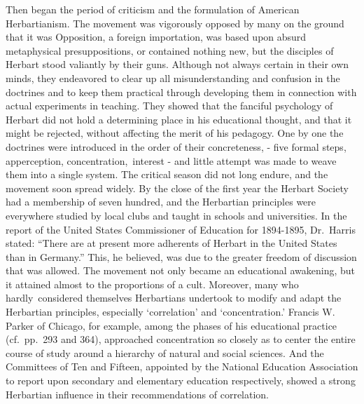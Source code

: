 \documentclass[]{book}
\begin{document}
Then began the period of criticism and the formulation of American Herbartianism. The movement was vigorously opposed by many on the ground that it was Opposition, a foreign importation, was based upon absurd metaphysical presuppositions, or contained nothing new, but the disciples of Herbart stood valiantly by their guns. Although not always certain in their own minds, they endeavored to clear up all misunderstanding and confusion in the doctrines and to keep them practical through developing them in connection with actual experiments in teaching. They showed that the fanciful psychology of Herbart did not hold a determining place in his educational thought, and that it might be rejected, without affecting the merit of his pedagogy. One by one the doctrines were introduced in the order of their concreteness, - five formal steps, apperception, concentration,~interest - and little attempt was made to weave them into a single system. The critical season did not long endure, and the movement soon spread widely. By the close of the first year the Herbart Society had a membership of seven hundred, and the Herbartian principles were everywhere studied by local clubs and taught in schools and universities. In the report of the United States Commissioner of Education for 1894-1895, Dr.~Harris stated: ``There are at present more adherents of Herbart in the United States than in Germany.'' This, he believed, was due to the greater freedom of discussion that was allowed. The movement not only became an educational awakening, but it attained almost to the proportions of a cult. Moreover, many who hardly~considered themselves Herbartians undertook to modify and adapt the Herbartian principles, especially `correlation' and `concentration.' Francis W. Parker of Chicago, for example, among the phases of his educational practice (cf.~pp.~293 and 364), approached concentration so closely as to center the entire course of study around a hierarchy of natural and social sciences. And the Committees of Ten and Fifteen, appointed by the National Education Association to report upon secondary and elementary education respectively, showed a strong Herbartian influence in their recommendations of correlation.
\end{document}

